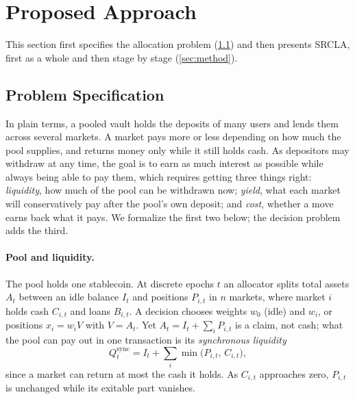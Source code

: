 \documentclass[sigconf]{acmart}
\begin{document}
\section{Proposed Approach}
\label{sec:approach}

This section first specifies the allocation problem (\cref{sec:problem}) and then presents SRCLA, first as a whole and then stage by stage (\cref{sec:method}).

\subsection{Problem Specification}
\label{sec:problem}

In plain terms, a pooled vault holds the deposits of many users and lends them across several markets. A market pays more or less depending on how much the pool supplies, and returns money only while it still holds cash. As depositors may withdraw at any time, the goal is to earn as much interest as possible while always being able to pay them, which requires getting three things right: \emph{liquidity}, how much of the pool can be withdrawn now; \emph{yield}, what each market will conservatively pay after the pool's own deposit; and \emph{cost}, whether a move earns back what it pays. We formalize the first two below; the decision problem adds the third.

\paragraph{Pool and liquidity.}
The pool holds one stablecoin. At discrete epochs $t$ an allocator splits total assets $A_t$ between an idle balance $I_t$ and positions $P_{i,t}$ in $n$ markets, where market $i$ holds cash $C_{i,t}$ and loans $B_{i,t}$. A decision chooses weights $w_0$ (idle) and $w_i$, or positions $x_i = w_i V$ with $V = A_t$. Yet $A_t = I_t + \sum_i P_{i,t}$ is a claim, not cash; what the pool can pay out in one transaction is its \emph{synchronous liquidity}
\begin{equation}
  Q^{\mathrm{sync}}_t = I_t + \textstyle\sum_{i} \min\bigl(P_{i,t},\, C_{i,t}\bigr),
  \label{eq:qsync}
\end{equation}
since a market can return at most the cash it holds. As $C_{i,t}$ approaches zero, $P_{i,t}$ is unchanged while its exitable part vanishes.
\end{document}
